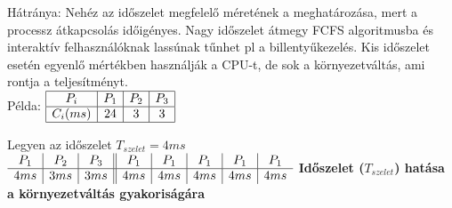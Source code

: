 \documentclass[tikz,12pt,margin=0px]{article}
\begin{document}
    \noindent Hátránya: Nehéz az időszelet megfelelő méretének a meghatározása, mert a processz átkapcsolás időigényes. Nagy időszelet átmegy FCFS algoritmusba és interaktív felhasználóknak lassúnak tűnhet pl a billentyűkezelés. Kis időszelet esetén egyenlő mértékben használják a CPU-t, de sok a környezetváltás, ami rontja a teljesítményt.\\

    {\small
    \noindent Példa: $\begin{array}{|c|c|c|c|}
                        \hline
                         P_{i} & P_{1} & P_{2} & P_{3} \\ \hline
                         C_{i}(ms) & 24 & 3 & 3 \\ \hline
                       \end{array}$\\
    }
    
    {\small
    \noindent Legyen az időszelet $T_{szelet} = 4 ms$\\

    \noindent $
      \begin{array}{c|c|c||c|c|c|c|c}
        P_{1} & P_{2} & P_{3} & P_{1} & P_{1} & P_{1} & P_{1} & P_{1} \\ \hline
        4ms & 3ms & 3ms & 4ms & 4ms & 4ms & 4ms & 4ms
      \end{array}\\
    $
    }
\newpage
    \noindent \textbf{Időszelet ($T_{szelet}$) hatása a környezetváltás gyakoriságára} \\
\end{document}

